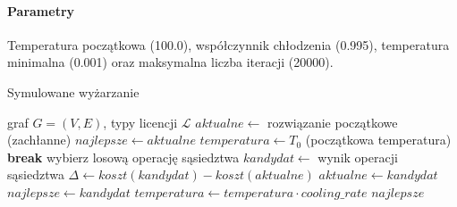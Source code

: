 \paragraph{Parametry}
Temperatura początkowa (100.0), współczynnik chłodzenia (0.995), temperatura minimalna (0.001) oraz maksymalna liczba iteracji (20000).

\begin{algorithm}[H]
  \caption{Symulowane wyżarzanie}
  \label{alg:sa}
  \begin{algorithmic}[1]
    \Require graf $G=(V,E)$, typy licencji $\mathcal{L}$
    \State $aktualne \gets$ rozwiązanie początkowe (zachłanne)
    \State $najlepsze \gets aktualne$
    \State $temperatura \gets T_0$ (początkowa temperatura)
     \textbf{break} \EndIf
    \State wybierz losową operację sąsiedztwa
    \State $kandydat \gets$ wynik operacji sąsiedztwa
    \State $\Delta \gets koszt(kandydat) - koszt(aktualne)$
    \State $aktualne \gets kandydat$
    \State $najlepsze \gets kandydat$
    \EndIf
    \EndIf
    \State $temperatura \gets temperatura \cdot cooling\_rate$
    \EndFor
    \State \Return $najlepsze$
  \end{algorithmic}
\end{algorithm}
